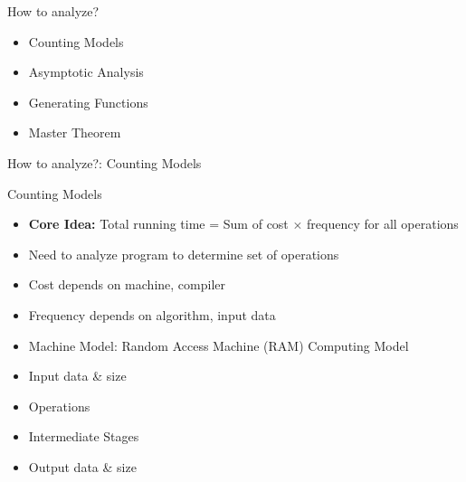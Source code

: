 \documentclass[aspectratio=169, xcolor=dvipsnames]{beamer}
\begin{document}
\begin{frame}{How to analyze?}
    \begin{block}{}
        \begin{itemize}[<+->]
            \item Counting Models
            \item Asymptotic Analysis
            \item Generating Functions
            \item Master Theorem
        \end{itemize}
    \end{block}
\end{frame}

\begin{frame}{How to analyze?: Counting Models}
    \begin{block}{Counting Models}
        \begin{itemize}[<+->]
            \item \textbf{Core Idea:} Total running time = Sum of cost $\times$ frequency for all operations
            \item Need to analyze program to determine set of operations
            \item Cost depends on machine, compiler
            \item Frequency depends on algorithm, input data
            \item Machine Model: Random Access Machine (RAM) Computing Model
            \item Input data \& size
            \item Operations
            \item Intermediate Stages
            \item Output data \& size
        \end{itemize}
    \end{block}
\end{frame}
\end{document}
